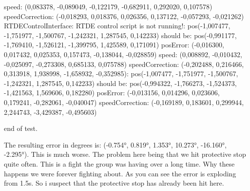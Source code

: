 \hspace{1cm}	speed: (0,083378, -0,089049, -0,122179, -0,682911, 0,292020, 0,107578)\newline 
\hspace{1cm}	speedCorrection: (-0,018293, 0,018376, 0,026356, 0,137122, -0,057293, -0,021262)\newline 
RTDEControlInterface: RTDE control script is not running!\newline 
[1,824000s - Step 228/251]:\newline 
\hspace{1cm}	pos(-1,007477, -1,751977, -1,500767, -1,242321, 1,287545, 0,142233) should be: \newline 
\hspace{1cm}	pos(-0,991177, -1,769410, -1,526121, -1,399795, 1,425589, 0,171091)\newline 
\hspace{1cm}	posError: (-0,016300, 0,017432, 0,025353, 0,157473, -0,138044, -0,028859)\newline 
\hspace{1cm}	speed: (0,008892, -0,010432, -0,025097, -0,273308, 0,685133, 0,075788)\newline 
\hspace{1cm}	speedCorrection: (-0,202488, 0,216466, 0,313918, 1,938998, -1,658932, -0,352985)\newline 
[2,000000s - Step 250/251]:\newline 
\hspace{1cm}	pos(-1,007477, -1,751977, -1,500767, -1,242321, 1,287545, 0,142233) should be: \newline 
\hspace{1cm}	pos(-0,994322, -1,766273, -1,524373, -1,421563, 1,569606, 0,182280)\newline 
\hspace{1cm}	posError: (-0,013156, 0,014296, 0,023606, 0,179241, -0,282061, -0,040047)\newline 
\hspace{1cm}	speedCorrection: (-0,169189, 0,183601, 0,299944, 2,244743, -3,429387, -0,495603)\newline 

end of test.\newline 

The resulting error in degrees is: (-0.754°, 0.819°, 1.353°, 10.273°, -16.160°, -2.295°). This is much worse. \newline 
The problem here being that we hit protective stop quite often. This is a fight the group was having over a long time. Why these happens we were forever fighting about. \newline 
As you can see the error is exploding from 1.5s. So i suspect that the protective stop has already been hit here.\newline 

